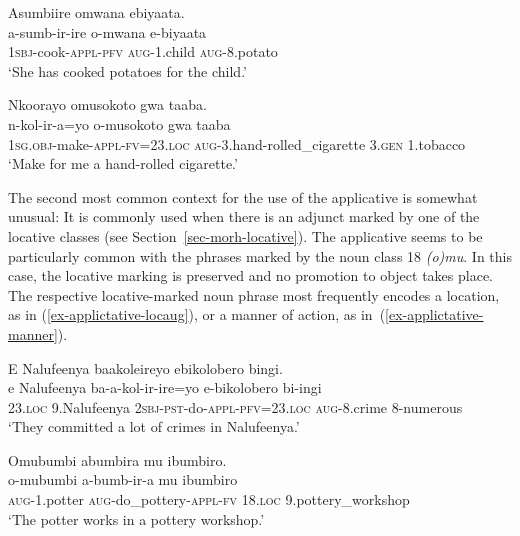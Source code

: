 \ea \label{ex-applictative-benef}
\begin{xlist}
	\ex \label{ex-applictative-benef-nominal}
	\glll  Asumbiire omwana ebiyaata.\\
		a-sumb-ir-ire o-mwana e-biyaata\\
		\textsc{1sbj}-cook-\textsc{appl}-\textsc{pfv} \textsc{aug}-1.child \textsc{aug}-8.potato\\
	\glt ‘She has cooked potatoes for the child.’	

	\ex \label{ex-applictative-benef-pronominal}
	\glll  Nkoorayo omusokoto gwa taaba.\\
		n-kol-ir-a=yo o-musokoto gwa taaba\\
		\textsc{1sg.obj}-make-\textsc{appl}-\textsc{fv}=23.\textsc{loc} \textsc{aug}-3.hand-rolled\_cigarette 3.\textsc{gen} 1.tobacco\\
	\glt ‘Make for me a hand-rolled cigarette.’	
\end{xlist}
\z

The second most common context for the use of the applicative is somewhat unusual: It is commonly used when there is an adjunct marked by one of the locative classes (see Section~\ref{sec-morh-locative}). 
The applicative seems to be particularly common with the phrases marked by the noun class 18 \emph{(o)mu}.  
In this case, the locative marking is preserved and no promotion to object takes place. 
The respective locative-marked noun phrase most frequently encodes a location, as in (\ref{ex-applictative-locaug}), or a manner of action, as in~(\ref{ex-applictative-manner}). 

\ea \label{ex-applictative-locaug}
\begin{xlist}
	\ex \label{ex-applictative-locaug-a}
	\glll  E Nalufeenya { }  baakoleireyo ebikolobero bingi.\\
	e Nalufeenya { }  ba-a-kol-ir-ire=yo e-bikolobero bi-ingi\\
		23.\textsc{loc}	9.Nalufeenya  { }  \textsc{2sbj}-\textsc{pst}-do-\textsc{appl}-\textsc{pfv}=23.\textsc{loc} \textsc{aug}-8.crime  8-numerous\\
	\glt ‘They committed a lot of crimes in Nalufeenya.'

	\ex \label{ex-applictative-a}
	\glll Omubumbi { } { }   abumbira { } { } { }   mu { } ibumbiro.\\
	  o-mubumbi  { } { }   a-bumb-ir-a { }  { } { }   mu { }  ibumbiro\\
		\textsc{aug}-1.potter  { }  { }  \textsc{aug}-do\_pottery-\textsc{appl}-\textsc{fv} { }  { }  { } 18.\textsc{loc}  { }  9.pottery\_workshop\\
	\glt ‘The potter works in a pottery workshop.'
\end{xlist}
\z

